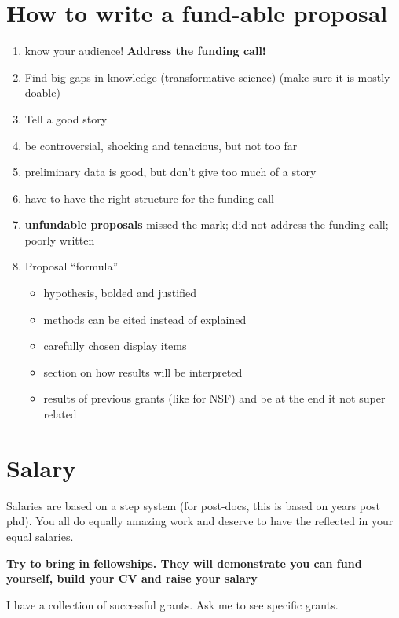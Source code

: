 \documentclass[12pt]{article}
\begin{document}
\section{How to write a fund-able proposal}

\begin{enumerate}
\item know your audience! \textbf{Address the funding call!}
\item Find big gaps in knowledge (transformative science) (make sure
  it is mostly doable)
\item Tell a good story
\item be controversial, shocking and tenacious, but not too far
\item preliminary data is good, but don't give too much of a story
\item have to have the right structure for the funding call
\item \textbf{unfundable proposals} missed the mark; did not address
  the funding call; poorly written
\item Proposal ``formula''
  \begin{itemize}
  \item hypothesis, bolded and justified
  \item methods can be cited instead of explained
  \item carefully chosen display items
  \item section on how results will be interpreted
  \item results of previous grants (like for NSF) and be at the end it
    not super related
  \end{itemize}
\end{enumerate}

\section{Salary}
Salaries are based on a step system (for post-docs, this
is based on years post phd). You all do equally amazing work and
deserve to have the reflected in your equal salaries. 

\textbf{Try to bring in fellowships. They will demonstrate you can
  fund yourself, build your CV and raise your salary}

I have a collection of successful grants. Ask me to see specific
grants.
\end{document}
